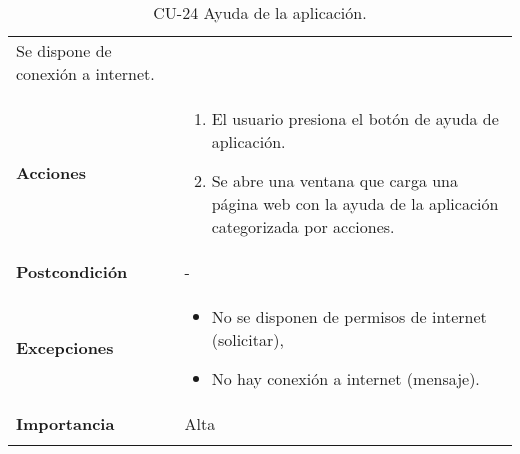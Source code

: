 \begin{longtable}[H]{@{}ll@{}}
\begin{minipage}[t]{0.74\columnwidth}
Se dispone de conexión a internet.\strut
\end{minipage}\tabularnewline
\begin{minipage}[t]{0.20\columnwidth}\raggedright\strut
\textbf{Acciones}\strut
\end{minipage} & \begin{minipage}[t]{0.74\columnwidth}\raggedright\strut
\begin{enumerate}
\def\labelenumi{\arabic{enumi}.}
\tightlist
\item
  El usuario presiona el botón de ayuda de aplicación.
\item
  Se abre una ventana que carga una página web con la ayuda de la
  aplicación categorizada por acciones.
\end{enumerate}\strut
\end{minipage}\tabularnewline
\begin{minipage}[t]{0.20\columnwidth}\raggedright\strut
\textbf{Postcondición}\strut
\end{minipage} & \begin{minipage}[t]{0.74\columnwidth}\raggedright\strut
-\strut
\end{minipage}\tabularnewline
\begin{minipage}[t]{0.20\columnwidth}\raggedright\strut
\textbf{Excepciones}\strut
\end{minipage} & \begin{minipage}[t]{0.74\columnwidth}\raggedright\strut
\begin{itemize}
\tightlist
\item
  No se disponen de permisos de internet (solicitar),
\item
  No hay conexión a internet (mensaje).
\end{itemize}\strut
\end{minipage}\tabularnewline
\begin{minipage}[t]{0.20\columnwidth}\raggedright\strut
\textbf{Importancia}\strut
\end{minipage} & \begin{minipage}[t]{0.74\columnwidth}\raggedright\strut
Alta\strut
\end{minipage}\tabularnewline
\bottomrule
\caption{CU-24 Ayuda de la aplicación.}
\end{longtable}

